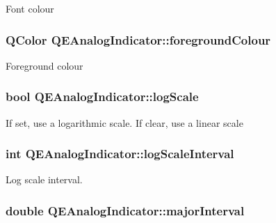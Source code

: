 \label{classQEAnalogIndicator_aa469d827ef97d89741a1eacf37c10086}
Font colour \hypertarget{classQEAnalogIndicator_a8a9d5b7e1181aeddf3a7022ebff74126}{
\subsubsection[{foregroundColour}]{\setlength{\rightskip}{0pt plus 5cm}QColor QEAnalogIndicator::foregroundColour}}
\label{classQEAnalogIndicator_a8a9d5b7e1181aeddf3a7022ebff74126}
Foreground colour \hypertarget{classQEAnalogIndicator_ad68533fcf52035397d9fb01086ab957c}{
\subsubsection[{logScale}]{\setlength{\rightskip}{0pt plus 5cm}bool QEAnalogIndicator::logScale}}
\label{classQEAnalogIndicator_ad68533fcf52035397d9fb01086ab957c}
If set, use a logarithmic scale. If clear, use a linear scale \hypertarget{classQEAnalogIndicator_a7ca36f10b9a6b449aa8acbe754d5e4c3}{
\subsubsection[{logScaleInterval}]{\setlength{\rightskip}{0pt plus 5cm}int QEAnalogIndicator::logScaleInterval}}
\label{classQEAnalogIndicator_a7ca36f10b9a6b449aa8acbe754d5e4c3}
Log scale interval. \hypertarget{classQEAnalogIndicator_a9b3fb4ab140aacdaa66b0c02df3d5a3e}{
\subsubsection[{majorInterval}]{\setlength{\rightskip}{0pt plus 5cm}double QEAnalogIndicator::majorInterval}}
